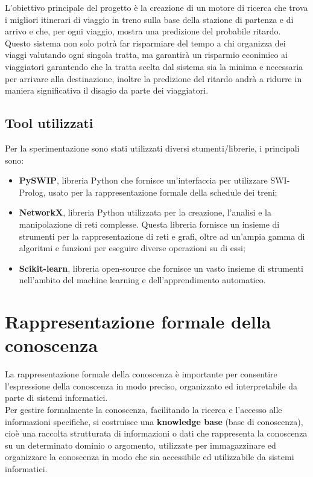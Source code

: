 \documentclass[italian,12pt,a4paper]{article}
\begin{document}
		L'obiettivo principale del progetto è la creazione di un motore di ricerca che trova i migliori itinerari di viaggio in treno sulla base della stazione di partenza e di arrivo e che, per ogni viaggio, mostra una predizione del probabile ritardo.\\
		Questo sistema non solo potrà far risparmiare del tempo a chi organizza dei viaggi valutando ogni singola tratta, ma garantirà un risparmio econimico ai viaggiatori garantendo che la tratta scelta dal sistema sia la minima e necessaria per arrivare alla destinazione, inoltre la predizione del ritardo andrà a ridurre in maniera significativa il disagio da parte dei viaggiatori. 
		
	
		\subsection{Tool utilizzati}
		Per la sperimentazione sono stati utilizzati diversi stumenti/librerie, i principali sono:
		
			\begin{itemize}
				\item \textbf{PySWIP}, libreria Python che fornisce un'interfaccia per utilizzare SWI-Prolog, usato per la rappresentazione formale della schedule dei treni;
				\item \textbf{NetworkX}, libreria Python utilizzata per la creazione, l'analisi e la manipolazione di reti complesse. Questa libreria fornisce un insieme di strumenti per la rappresentazione di reti e grafi, oltre ad un'ampia gamma di algoritmi e funzioni per eseguire diverse operazioni su di essi;
				\item \textbf{Scikit-learn}, libreria open-source che fornisce un vasto insieme di strumenti nell'ambito del machine learning e dell'apprendimento automatico.
			\end{itemize}

	\section{Rappresentazione formale della conoscenza}
	
		La rappresentazione formale della conoscenza è importante per consentire l'espressione della conoscenza in modo preciso, organizzato ed interpretabile da parte di sistemi informatici.\\
		Per gestire formalmente la conoscenza, facilitando la ricerca e l'accesso alle informazioni specifiche, si costruisce una \textbf{knowledge base} (base di conoscenza), cioè una raccolta strutturata di informazioni o dati che rappresenta la conoscenza su un determinato dominio o argomento, utilizzate per immagazzinare ed organizzare la conoscenza in modo che sia accessibile ed utilizzabile da sistemi informatici.
		
\end{document}
